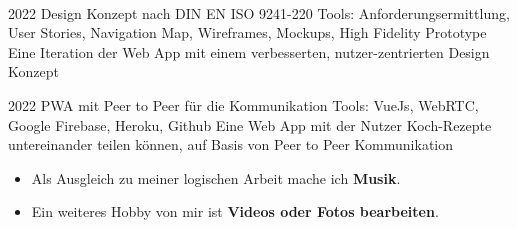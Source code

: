 \begin{paracol}{2}
    \begin{leftcolumn}
    
    
    \end{leftcolumn}
    
    \begin{rightcolumn}
    
     \\[14pt]
    \vspace{-12pt}
    
    \vfill\null
    \cvevent
        {2022}
        {Design Konzept nach DIN EN ISO 9241-220}
        {Tools: Anforderungsermittlung, User Stories, Navigation Map, Wireframes, Mockups, High Fidelity Prototype}
        {Eine Iteration der Web App mit einem verbesserten, nutzer-zentrierten Design Konzept}
    \vfill\null
    
    \cvevent
        {2022}
        {PWA mit Peer to Peer für die Kommunikation}
        {Tools: VueJs, WebRTC, Google Firebase, Heroku, Github}
        {Eine Web App mit der Nutzer Koch-Rezepte untereinander teilen können, auf Basis von Peer to Peer Kommunikation}
    \vfill\null
    
    \vfill\null
    \vspace{-0.3cm}
    \begin{itemize}
      \item Als Ausgleich zu meiner logischen Arbeit mache ich \textbf{Musik}.
      \item Ein weiteres Hobby von mir ist \textbf{Videos oder Fotos bearbeiten}.
    \end{itemize}
    \vfill\null
    
    \vfill
    \vfill
    \vfill
    \end{rightcolumn}
    \end{paracol}